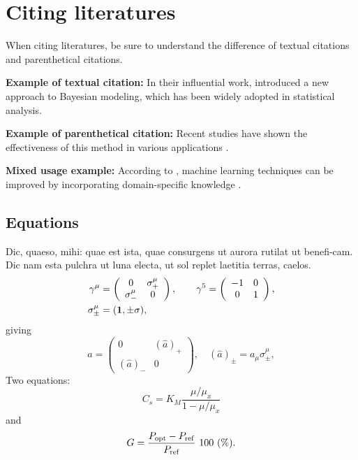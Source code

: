 \documentclass[linenumber]{jdsart}
\theoremstyle{plain}
\theoremstyle{remark}
\theoremstyle{definition}
\begin{document}
\section{Citing literatures}
When citing literatures, be sure to understand the difference of
textual citations and parenthetical citations.

\textbf{Example of textual citation:}
In their influential work, \citet{carlin1992monte} introduced a new
approach to Bayesian modeling, which has been widely adopted in
statistical analysis.

\textbf{Example of parenthetical citation:}
Recent studies have shown the effectiveness of this method in various
applications \citep{gamado2014modelling,  gamado2017estimation}.

\textbf{Mixed usage example:}
According to \citet{carlin1992monte}, machine learning techniques
can be improved by incorporating domain-specific knowledge
\citep[see also][]{kotz2001laplace}.

\subsection{Equations}

Dic, quaeso, mihi: quae est ista, quae consurgens ut aurora rutilat
ut benefi-cam.  Dic nam esta pulchra ut luna electa, ut sol replet
laetitia terras, caelos. 
%
\begin{align}
\gamma^\mu & =
\left(
%
\begin{array}{cc}
0            & \sigma^\mu_+ \\
\sigma^\mu_- & 0
\end{array}
%
\right),
\qquad
\gamma^5= \left(
%
\begin{array}{cc}
-1 & 0 \\
0  & 1
\end{array}
%
\right),\nonumber\\
\sigma^\mu_{\pm} & = ({\bf1} ,\pm\sigma) , \nonumber
\end{align}
%
giving
%
\begin{equation}
\hat a= \left(
%
\begin{array}{cc}
0          & (\hat a)_+ \\
(\hat a)_- & 0
\end{array}
%
\right),\quad(\hat a)_\pm=a_\mu\sigma^\mu_\pm,
\end{equation}
%
Two equations:
%
\begin{equation}
C_{s} = K_{M} \frac{\mu/\mu_{x}}{1-\mu/\mu_{x}} \label{ccs}
\end{equation}
%
and
%
\begin{equation}
G = \frac{P_{\rm opt} - P_{\rm ref}}{P_{\rm ref}}\ 100\ (\%).
\end{equation}
\end{document}
